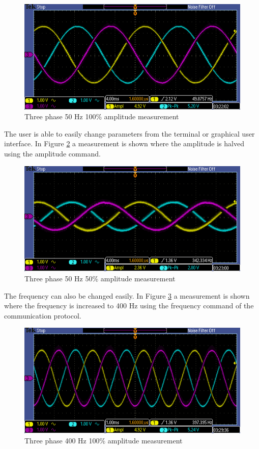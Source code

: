 \begin{figure}[h!]
\centering
\includegraphics[width=0.65\linewidth]{pictures/three_phase_ampl100_50hz.png}

\caption{Three phase 50 Hz 100\% amplitude measurement}
\label{measurement_100_50hz}
\end{figure}


The user is able to easily change parameters from the terminal or graphical user interface. In Figure \ref{measurement_50_50hz} a measurement is shown where the amplitude is halved using the amplitude command.

\begin{figure}[h!]
\centering
\includegraphics[width=0.65\linewidth]{pictures/three_phase_ampl50_50hz.png}
\caption{Three phase 50 Hz 50\% amplitude measurement}
\label{measurement_50_50hz}
\end{figure}



The frequency can also be changed easily. In Figure \ref{measurement_100_400hz} a measurement is shown where the frequency is increased to 400 Hz using the frequency command of the communication protocol.

\begin{figure}[h!]
\centering
\includegraphics[width=0.65\linewidth]{pictures/three_phase_ampl100_400hz.png}
\caption{Three phase 400 Hz 100\% amplitude measurement}
\label{measurement_100_400hz}
\end{figure}

